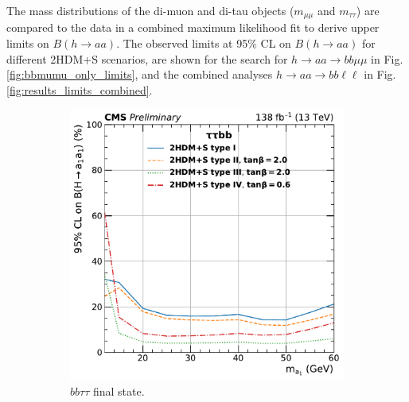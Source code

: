 The mass distributions of the di-muon and di-tau objects ($m_{\mu\mu}$ and $m_{\tau\tau}$) are compared to the data in a combined maximum likelihood fit to derive upper limits on $B(h\rightarrow aa)$. The observed limits at 95\% CL on $B(h \rightarrow aa)$ for different 2HDM+S scenarios, are shown for the search for $h \rightarrow aa \rightarrow bb\mu\mu$ in Fig. \ref{fig:bbmumu_only_limits}, and the combined analyses $h \rightarrow aa \rightarrow bb\ell\ell$ in Fig. \ref{fig:results_limits_combined}. 

\begin{figure}[ht]
  \begin{subfigure}{0.45\textwidth}
    \includegraphics[width=1.0\textwidth]{figures/ch-10-results/HAA_bbtt_all_prelim.pdf}
    \caption{$bb\tau\tau$ final state.}
    \label{fig:bbtautau_only_limits}
\end{subfigure}
\hfill
\begin{subfigure}{0.45\textwidth}

\end{subfigure}
\end{figure}
